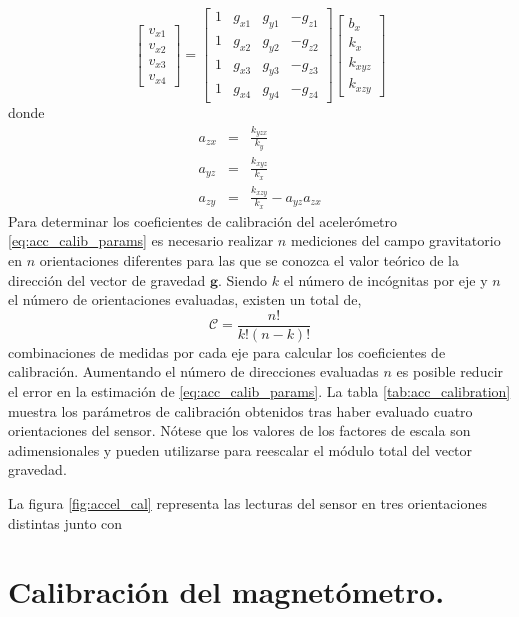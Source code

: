\documentclass[a4paper,12pt]{book}
\begin{document}
\begin{equation}
    \begin{bmatrix} v_{x1}\\ v_{x2} \\ v_{x3} \\ v_{x4}   \end{bmatrix} = \begin{bmatrix} 1&  g_{x1} & g_{y1} & -g_{z1} \\ 1&g_{x2} &  g_{y2} & -g_{z2} \\ 1 &g_{x3} &  g_{y3} & -g_{z3}  \\ 1 &g_{x4} &  g_{y4} & -g_{z4}   \end{bmatrix} \begin{bmatrix} b_x \\ k_x \\ k_{xyz} \\ k_{xzy}   \end{bmatrix}
\end{equation}
donde
\begin{eqnarray}
    a_{zx} &=& \frac{k_{yzx}}{k_y}\\
    a_{yz} &=& \frac{k_{xyz}}{k_x}\\
    a_{zy} &=& \frac{k_{xzy}}{k_x} - a_{yz}a_{zx}
\end{eqnarray}
Para determinar los coeficientes de calibración del acelerómetro \eqref{eq:acc_calib_params} es necesario realizar $n$ mediciones del campo gravitatorio en $n$ orientaciones diferentes para las que se conozca el valor teórico de la dirección del vector de gravedad $\mathbf{g}$. Siendo $k$ el número de incógnitas por eje y $n$ el número de orientaciones evaluadas, existen un total de,
\begin{equation}
    \mathcal{C} = \frac{n!}{k!(n - k)!}
\end{equation}
combinaciones de medidas por cada eje para calcular los coeficientes de calibración. Aumentando el número de direcciones evaluadas $n$ es posible reducir el error en la estimación de \eqref{eq:acc_calib_params}. La tabla \ref{tab:acc_calibration} muestra los parámetros de calibración obtenidos tras haber evaluado cuatro orientaciones del sensor. Nótese que los valores de los factores de escala son adimensionales y pueden utilizarse para reescalar el módulo total del vector gravedad.

La figura \ref{fig:accel_cal} representa las lecturas del sensor en tres orientaciones distintas junto con 



\section{Calibración del magnetómetro.}
\end{document}
